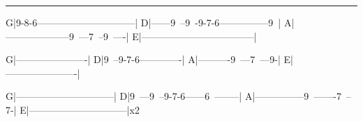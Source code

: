 \documentclass{article}
\begin{document}
\noindent\rule{10cm}{1pt}
\mytabenv
G|9-8-6------------------------------|
D|------9~--9~-9-7-6---------------9~|
A|--------------------9~---7~--9~----|
E|-----------------------------------|
\endmytabenv

\mytabenv%
G|----------------------|
D|9~--9-7-6-------------|
A|----------9~---7~---9-|
E|----------------------|
\endmytabenv

\mytabenv%
G|------------------------------|
D|9~---9~--9-7-6------6~--------|
A|---------------9~-------7~--7-|
E|------------------------------|x2
\endmytabenv
\end{document}
